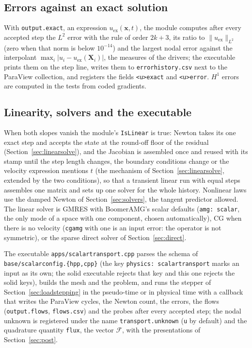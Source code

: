 \documentclass[11pt]{article}
\newcommand{\bx}{\bm{x}}
\newcommand{\bX}{\bm{X}}
\DeclareRobustCommand{\code}[1]{{\def\_{\textunderscore\allowbreak}\texttt{#1}}}
\DeclareRobustCommand{\file}[1]{{\def\_{\textunderscore\allowbreak}\texttt{#1}}}
\begin{document}
\subsection{Errors against an exact solution}

With \code{output.exact}, an expression $u_{\mathrm{ex}}(\bx, t)$, the module
computes after every accepted step the $L^2$ error with the rule of order
$2k + 3$, its ratio to $\|u_{\mathrm{ex}}\|_{L^2}$ (zero when that norm is
below $10^{-14}$) and the largest nodal error against the interpolant
$\max_i |u_i - u_{\mathrm{ex}}(\bX_i)|$, the measures of the drivers; the
executable prints them on the step line, writes them to
\file{error\_history.csv} next to the ParaView collection, and registers
the fields \code{<u>\_exact} and \code{<u>\_error}.  $H^1$ errors are
computed in the tests from coded gradients.

\subsection{Linearity, solvers and the executable}
\label{sec:scalarlinear}

When both slopes vanish the module's \code{IsLinear} is true: Newton takes
its one exact step and accepts the state at the round-off floor of the
residual (Section~\ref{sec:linearsolve}), and the Jacobian is assembled once
and reused with its stamp until the step length changes, the boundary
conditions change or the velocity expression mentions $t$ (the mechanism
of Section~\ref{sec:linearsolve}, extended by the two conditions), so that a
transient linear run with equal steps assembles one matrix and sets up one
solver for the whole history.  Nonlinear laws use the damped Newton of
Section~\ref{sec:solvers}, the tangent predictor allowed.  The linear
solver is GMRES with BoomerAMG's scalar defaults (\code{amg: scalar}, the
only mode of a space with one component, chosen automatically), CG when
there is no velocity (\code{cg\_amg} with one is an input error: the
operator is not symmetric), or the sparse direct solver of
Section~\ref{sec:direct}.

The executable \file{apps/scalar\_transport.cpp} parses the schema of
\file{base/scalar\_config.\{hpp,cpp\}} (the key \code{physics:
scalar\_transport} marks an input as its own; the solid executable rejects
that key and this one rejects the solid keys), builds the mesh and the
problem, and runs the stepper of Section~\ref{sec:loadstepping} in the
pseudo-time or in physical time with a callback that writes the ParaView
cycles, the Newton count, the errors, the flows (\code{output.flows},
\file{flows.csv}) and the probes after every accepted step; the nodal
unknown is registered under the name \code{transport.unknown} (\code{u} by
default) and the quadrature quantity \code{flux}, the vector
$\bm{\mathcal F}$, with the presentations of Section~\ref{sec:post}.
\end{document}
